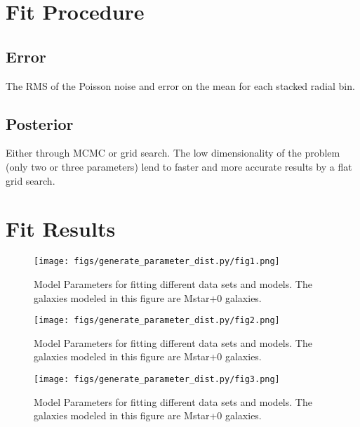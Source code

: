 \documentclass[twocolumn]{article}
\begin{document}
\section{Fit Procedure}

\subsection{Error}
The RMS of the Poisson noise and error on the mean for each stacked radial bin.

\subsection{Posterior}
Either through MCMC or grid search. The low dimensionality of the
problem (only two or three parameters) lend to faster and more
accurate results by a flat grid search. 

\section{Fit Results}
\begin{figure}
  \texttt{[image: figs/generate\_parameter\_dist.py/fig1.png]}
  \caption{Model Parameters for fitting different data sets and
    models. The galaxies modeled in this figure are Mstar+0 galaxies. }
\end{figure}
\begin{figure}
  \texttt{[image: figs/generate\_parameter\_dist.py/fig2.png]}
  \caption{Model Parameters for fitting different data sets and
    models. The galaxies modeled in this figure are Mstar+0 galaxies. }
\end{figure}

\begin{figure}
  \texttt{[image: figs/generate\_parameter\_dist.py/fig3.png]}
  \caption{Model Parameters for fitting different data sets and
    models. The galaxies modeled in this figure are Mstar+0 galaxies. }
\end{figure}

\twocolumn
\clearpage
\appendix
\onecolumn

\end{document}
